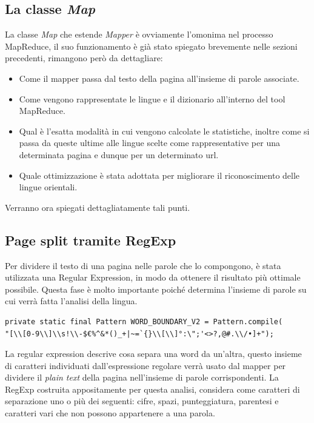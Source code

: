 \documentclass{article}
\newcommand{\MR}{MapReduce}
\newcommand{\pt}{\textit{plain text}}
\newcommand{\class}[1]{\textit{#1}}
\begin{document}
\subsection{La classe \class{Map}}
La classe \class{Map} che estende \class{Mapper} è ovviamente l'omonima nel processo \MR{}, il suo funzionamento è già stato spiegato brevemente nelle sezioni precedenti, rimangono però da dettagliare:
\begin{itemize}
    \item Come il mapper passa dal testo della pagina all'insieme di parole associate.
    \item Come vengono rappresentate le lingue e il dizionario all'interno del tool \MR{}.
    \item Qual è l'esatta modalità in cui vengono calcolate le statistiche, inoltre come si passa da queste ultime alle lingue scelte come rappresentative per una determinata pagina e dunque per un determinato url.
    \item Quale ottimizzazione è stata adottata per migliorare il riconoscimento delle lingue orientali.
\end{itemize}
Verranno ora spiegati dettagliatamente tali punti.

\subsection{Page split tramite RegExp}
Per dividere il testo di una pagina nelle parole che lo compongono, è stata utilizzata una Regular Expression, in modo da ottenere il risultato più ottimale possibile. Questa fase è molto importante poiché determina l'insieme di parole su cui verrà fatta l'analisi della lingua.
\begin{verbatim}
private static final Pattern WORD_BOUNDARY_V2 = Pattern.compile(
"[\\[0-9\\]\\s!\\-$€%^&*()_+|~=`{}\\[\\]°:\";'<>?,@#.\\/•]+");
\end{verbatim}

La regular expression descrive cosa separa una word da un'altra, questo insieme di caratteri individuati dall'espressione regolare verrà usato dal mapper per dividere il \pt{} della pagina nell'insieme di parole corrispondenti. La RegExp costruita appositamente per questa analisi, considera come caratteri di separazione uno o più dei seguenti: cifre, spazi, punteggiatura, parentesi e caratteri vari che non possono appartenere a una parola. 
\end{document}
